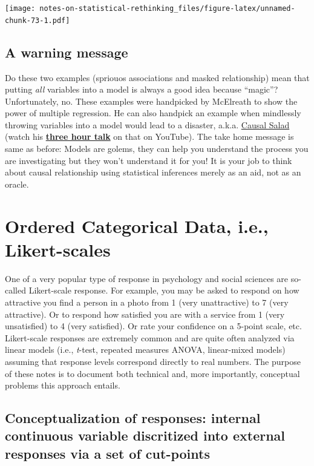 \documentclass[
]{book}
\begin{document}
\texttt{[image: notes-on-statistical-rethinking\_files/figure-latex/unnamed-chunk-73-1.pdf]}

\hypertarget{a-warning-message}{%
\section{A warning message}\label{a-warning-message}}

Do these two examples (spriouos associations and masked relationship) mean that putting \emph{all} variables into a model is always a good idea because ``magic''? Unfortunately, no. These examples were handpicked by McElreath to show the power of multiple regression. He can also handpick an example when mindlessly throwing variables into a model would lead to a disaster, a.k.a. \href{https://elevanth.org/blog/2021/06/15/regression-fire-and-dangerous-things-1-3/}{Causal Salad} (watch his \href{https://youtu.be/KNPYUVmY3NM}{\textbf{three hour talk}} on that on YouTube). The take home message is same as before: Models are golems, they can help you understand the process you are investigating but they won't understand it for you! It is your job to think about causal relationship using statistical inferences merely as an aid, not as an oracle.

\hypertarget{ordered-categorical-data-i.e.-likert-scales}{%
\chapter{Ordered Categorical Data, i.e., Likert-scales}\label{ordered-categorical-data-i.e.-likert-scales}}

One of a very popular type of response in psychology and social sciences are so-called Likert-scale response. For example, you may be asked to respond on how attractive you find a person in a photo from 1 (very unattractive) to 7 (very attractive). Or to respond how satisfied you are with a service from 1 (very unsatisfied) to 4 (very satisfied). Or rate your confidence on a 5-point scale, etc. Likert-scale responses are extremely common and are quite often analyzed via linear models (i.e., \emph{t}-test, repeated measures ANOVA, linear-mixed models) assuming that response levels correspond directly to real numbers. The purpose of these notes is to document both technical and, more importantly, conceptual problems this approach entails.

\hypertarget{conceptualization-of-responses-internal-continuous-variable-discritized-into-external-responses-via-a-set-of-cut-points}{%
\section{Conceptualization of responses: internal continuous variable discritized into external responses via a set of cut-points}\label{conceptualization-of-responses-internal-continuous-variable-discritized-into-external-responses-via-a-set-of-cut-points}}
\end{document}
